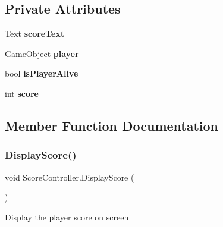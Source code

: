\subsection*{Private Attributes}
\begin{DoxyCompactItemize}
\item 
\mbox{\label{class_score_controller_a7152e2b1715326c8a1ab07c6b3d1ca4b}} 
Text {\bfseries score\+Text}
\item 
\mbox{\label{class_score_controller_a298e704782a4d367d5c5ecd9087df605}} 
Game\+Object {\bfseries player}
\item 
\mbox{\label{class_score_controller_a56142ff2bc2db471d2a4eb7ef574392e}} 
bool {\bfseries is\+Player\+Alive}
\item 
\mbox{\label{class_score_controller_a1be2da4c8951c565e55406e546d48651}} 
int {\bfseries score}
\end{DoxyCompactItemize}


\subsection{Member Function Documentation}
\mbox{\label{class_score_controller_a5203e920a41f5155943e57c4b7f1872f}} 
\subsubsection{\texorpdfstring{Display\+Score()}{DisplayScore()}}
{\footnotesize\ttfamily void Score\+Controller.\+Display\+Score (\begin{DoxyParamCaption}{ }\end{DoxyParamCaption})\hspace{0.3cm}{\ttfamily [private]}}

Display the player score on screen \mbox{\label{class_score_controller_abe909e78ac7e5c6632103249647a8ede}} 
